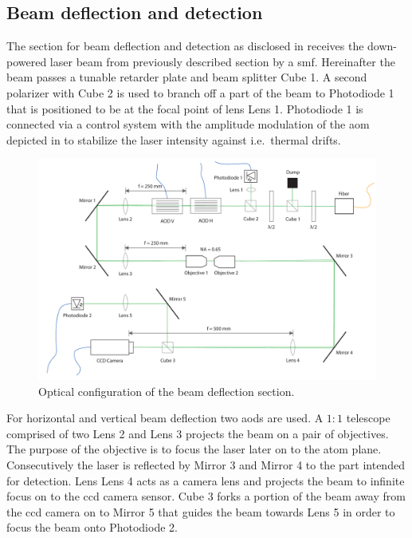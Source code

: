 \subsection{Beam deflection and detection}\label{subsec:setup_deflection_detection}

The section for beam deflection and detection as disclosed in
 receives the down-powered laser beam from
previously described section by a \gls{smf}. Hereinafter the beam passes a
tunable retarder plate and beam splitter Cube 1. A second polarizer with
Cube 2 is used to branch off a part of the beam to Photodiode 1 that is
positioned to be at the focal point of lens Lens 1. Photodiode 1 is connected
via a control system with the amplitude modulation of the \gls{aom} depicted
in  to stabilize the laser intensity against
i.e.\ thermal drifts.
\begin{figure}[htb]
  \centering
  \includegraphics[width=\textwidth]{../figure/setup/beam-deflection.pdf}
  \caption{Optical configuration of the beam deflection section.
  }\label{fig:setup_beam_deflection}
\end{figure}
For horizontal and vertical beam deflection two \gls{aod}s are used. A $1:1$
telescope comprised of two Lens 2 and Lens 3 projects the beam on a pair of
objectives. The purpose of the objective is to focus the laser later on to the
atom plane. Consecutively the laser is reflected by Mirror 3 and Mirror 4 to
the part intended for detection. Lens Lens 4 acts as a camera lens and
projects the beam to infinite focus on to the \gls{ccd} camera sensor. Cube 3
forks a portion of the beam away from the \gls{ccd} camera on to Mirror 5 that
guides the beam towards Lens 5 in order to focus the beam onto Photodiode 2.

